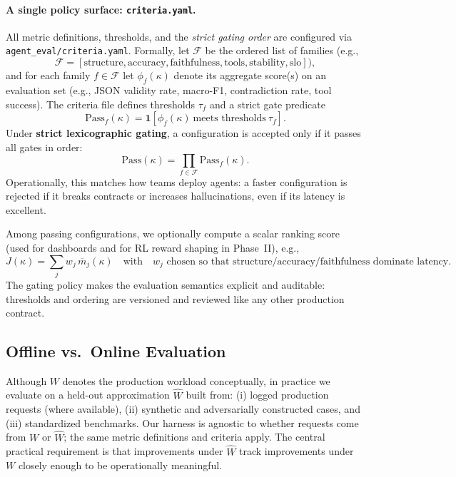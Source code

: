 \documentclass[11pt]{article}
\begin{document}
\paragraph{A single policy surface: \texttt{criteria.yaml}.}
All metric definitions, thresholds, and the \emph{strict gating order} are configured via \texttt{agent\_eval/criteria.yaml}.
Formally, let $\mathcal{F}$ be the ordered list of families (e.g.,
\[
\mathcal{F}=[\text{structure},\text{accuracy},\text{faithfulness},\text{tools},\text{stability},\text{slo}]),
\]
and for each family $f\in\mathcal{F}$ let $\phi_f(\kappa)$ denote its aggregate score(s) on an evaluation set (e.g., JSON validity rate, macro-F1, contradiction rate, tool success).
The criteria file defines thresholds $\tau_f$ and a strict gate predicate
\[
\mathrm{Pass}_f(\kappa)=\mathbf{1}\!\left[\phi_f(\kappa)\ \text{meets thresholds}\ \tau_f\right].
\]
Under \textbf{strict lexicographic gating}, a configuration is accepted only if it passes all gates in order:
\[
\mathrm{Pass}(\kappa)=\prod_{f\in\mathcal{F}}\mathrm{Pass}_f(\kappa).
\]
Operationally, this matches how teams deploy agents: a faster configuration is rejected if it breaks contracts or increases hallucinations, even if its latency is excellent.

Among passing configurations, we optionally compute a scalar ranking score (used for dashboards and for RL reward shaping in Phase~II), e.g.,
\[
J(\kappa)=\sum_{j} w_j \,\overline{m}_j(\kappa)
\quad\text{with}\quad w_j \text{ chosen so that structure/accuracy/faithfulness dominate latency.}
\]
The gating policy makes the evaluation semantics explicit and auditable: thresholds and ordering are versioned and reviewed like any other production contract.

\subsection{Offline vs.\ Online Evaluation}

Although $W$ denotes the production workload conceptually, in practice we evaluate on a held-out approximation $\widehat{W}$ built from:
(i) logged production requests (where available),
(ii) synthetic and adversarially constructed cases, and
(iii) standardized benchmarks.
Our harness is agnostic to whether requests come from $W$ or $\widehat{W}$; the same metric definitions and criteria apply.
The central practical requirement is that improvements under $\widehat{W}$ track improvements under $W$ closely enough to be operationally meaningful.
\end{document}
